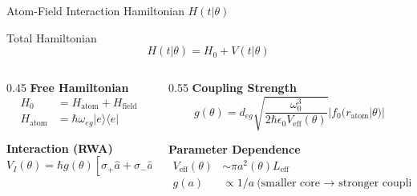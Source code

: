 \documentclass[10pt]{beamer}
\begin{document}
\begin{frame}{Atom-Field Interaction Hamiltonian $H(t|\theta)$}
\begin{block}{Total Hamiltonian}
\begin{equation*}
H(t|\theta) = H_0 + V(t|\theta)
\end{equation*}
\end{block}

\begin{columns}
\begin{column}{0.45\textwidth}
\textbf{Free Hamiltonian}
\begin{align*}
H_0 &= H_{\text{atom}} + H_{\text{field}} \\
H_{\text{atom}} &= \hbar\omega_{eg}|e\rangle\langle e|
\end{align*}

\textbf{Interaction (RWA)}
\begin{equation*}
V_I(\theta) = \hbar g(\theta)[\sigma_+ \hat{a} + \sigma_- \hat{a}^\dagger]
\end{equation*}
\end{column}

\begin{column}{0.55\textwidth}
\textbf{Coupling Strength}
\begin{equation*}
g(\theta) = d_{eg}\sqrt{\frac{\omega_0^3}{2\hbar\epsilon_0 V_{\text{eff}}(\theta)}}|f_0(r_{\text{atom}}|\theta)|
\end{equation*}

\textbf{Parameter Dependence}
\begin{align*}
V_{\text{eff}}(\theta) &\sim \pi a^2(\theta) L_{\text{eff}} \\
g(a) &\propto 1/a \ \text{(smaller core → stronger coupling)}
\end{align*}
\end{column}
\end{columns}
\end{frame}
\end{document}
